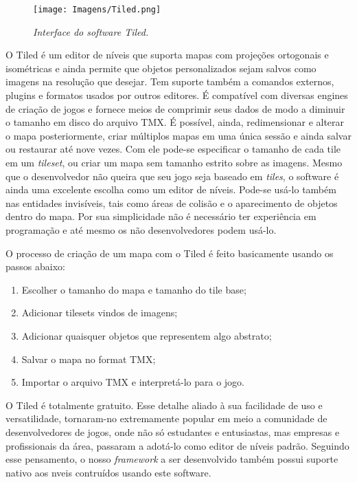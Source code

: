 \documentclass[a4paper,12pt]{report}
\begin{document}
%
\begin{figure}[H]
    \centering
    \texttt{[image: Imagens/Tiled.png]}
    \caption{\textit{Interface do \textit{software} Tiled.}}
    \label{tiled_interface}
\end{figure}
%
\par
O Tiled é um editor de níveis que suporta mapas com projeções ortogonais e isométricas e ainda permite que 
objetos personalizados sejam salvos como imagens na resolução que desejar. Tem suporte também a comandos externos, 
plugins e formatos usados por outros editores. É compatível 
com diversas engines de criação de jogos e fornece meios de comprimir seus dados de modo a diminuir o tamanho em disco do arquivo TMX.
É possível, ainda, redimensionar e alterar o mapa posteriormente, criar múltiplos mapas em uma única sessão e ainda salvar ou 
restaurar até nove vezes. Com ele pode-se especificar o tamanho de cada tile em um \textit{tileset}, ou criar um mapa sem tamanho estrito 
sobre as imagens.
Mesmo que o desenvolvedor não queira que seu jogo seja baseado em \textit{tiles}, o software é ainda uma excelente escolha como um editor 
de níveis. Pode-se usá-lo também nas entidades invisíveis, tais como áreas de colisão e o aparecimento de objetos dentro do 
mapa. Por sua simplicidade não é necessário ter experiência em programação e até mesmo os não desenvolvedores podem usá-lo.
\par 
O processo de criação de um mapa com o Tiled é feito basicamente usando os passos abaixo:
%
\begin{enumerate}
 \item Escolher o tamanho do mapa e tamanho do tile base;
 \item Adicionar tilesets vindos de imagens;
 \item Adicionar quaisquer objetos que representem algo abstrato;
 \item Salvar o mapa no format TMX;
 \item Importar o arquivo TMX e interpretá-lo para o jogo.
\end{enumerate}
O Tiled é totalmente gratuito. Esse detalhe aliado à sua facilidade de uso e versatilidade, tornaram-no extremamente popular em meio
a comunidade de desenvolvedores de jogos, onde não só estudantes e entusiastas, mas empresas e profissionais da área, passaram a adotá-lo 
como editor de níveis padrão. Seguindo esse pensamento, o nosso \textit{framework} a ser desenvolvido também possui suporte nativo
aos nveis contruídos usando este software.
%
\end{document}
